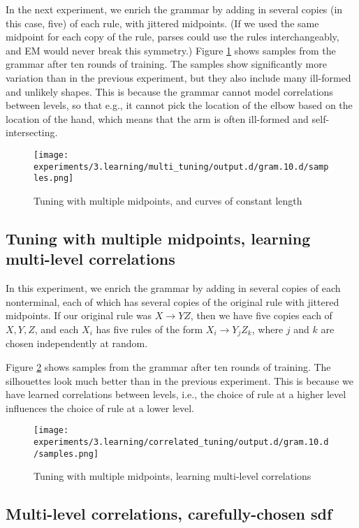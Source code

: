 In the next experiment, we enrich the grammar by adding in several
copies (in this case, five) of each rule, with jittered midpoints. (If
we used the same midpoint for each copy of the rule, parses could use
the rules interchangeably, and EM would never break this symmetry.)
Figure \ref{fig-em-multi} shows samples from the grammar after ten
rounds of training. The samples show significantly more variation than
in the previous experiment, but they also include many ill-formed and
unlikely shapes. This is because the grammar cannot model correlations
between levels, so that e.g., it cannot pick the location of the elbow
based on the location of the hand, which means that the arm is often
ill-formed and self-intersecting.

\begin{figure}
\texttt{[image: experiments/3.learning/multi\_tuning/output.d/gram.10.d/samples.png]}
\caption{Tuning with multiple midpoints, and curves of constant length}
\label{fig-em-multi}
\end{figure}

\subsection{Tuning with multiple midpoints, learning multi-level correlations}

In this experiment, we enrich the grammar by adding in several copies
of each nonterminal, each of which has several copies of the original
rule with jittered midpoints. If our original rule was $X\to YZ$, then
we have five copies each of $X,Y,Z$, and each $X_i$ has five rules of
the form $X_i \to Y_j Z_k$, where $j$ and $k$ are chosen independently
at random.

Figure \ref{fig-em-correlated} shows samples from the grammar after
ten rounds of training. The silhouettes look much better than in the
previous experiment. This is because we have learned correlations
between levels, i.e., the choice of rule at a higher level influences
the choice of rule at a lower level.

\begin{figure}
\texttt{[image: experiments/3.learning/correlated\_tuning/output.d/gram.10.d/samples.png]}
\caption{Tuning with multiple midpoints, learning multi-level correlations}
\label{fig-em-correlated}
\end{figure}

\subsection{Multi-level correlations, carefully-chosen sdf}

